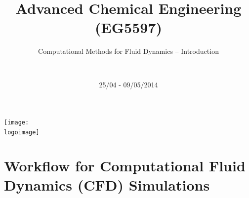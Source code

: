 \documentclass[10pt,compress]{beamer}
\institute{School of Engineering}
\title{Advanced Chemical Engineering (EG5597)}
\subtitle{Computational Methods for Fluid Dynamics -- Introduction}
\date[25/04 - 09/05/2014]{25/04 - 09/05/2014}
\author[\shortname]{%
  \fullname\\\ttfamily{\emailaddress}
}
\newcommand{\logoimage}{./FigBanner/UoAHorizBanner}
\begin{document}
\begin{frame}
  \titlepage
  \vfill%
  \begin{center}
    \texttt{[image: \\logoimage]}
  \end{center}
\end{frame}




\section{Workflow for Computational Fluid Dynamics (CFD) Simulations}

\end{document}
